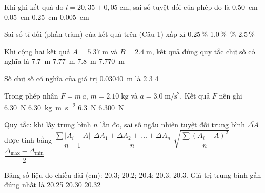 \begin{ex}
	Khi ghi kết quả đo $l = 20{,}35 \pm 0{,}05\;\si{\centi\meter}$, sai số tuyệt đối của phép đo là
	\choice
	{\SI{0.50}{\centi\meter}}
	{\True \SI{0.05}{\centi\meter}}
	{\SI{0.25}{\centi\meter}}
	{\SI{0.005}{\centi\meter}}
	\loigiai{}
\end{ex}

\begin{ex}
	Sai số tỉ đối (phần trăm) của kết quả trên (Câu 1) xấp xỉ
	\choice
	{0.25\,\%}
	{1.0\,\%}
	{\,\%}
	{2.5\,\%}
\end{ex}

\begin{ex}
	Khi cộng hai kết quả $A = 5.37\;\si{\meter}$ và $B = 2.4\;\si{\meter}$, kết quả đúng quy tắc chữ số có nghĩa là
	\choice
	{\SI{7.7}{\meter}}
	{\SI{7.77}{\meter}}
	{\True \SI{7.8}{\meter}}
	{\SI{7.770}{\meter}}
\end{ex}

\begin{ex}
	Số chữ số có nghĩa của giá trị \SI{0.03040}{\meter} là
	\choice
	{2}
	{3}
	{4}
	{}
	\loigiai{}
\end{ex}

\begin{ex}
	Trong phép nhân $F = m\,a$, $m = 2.10\;\si{\kilogram}$ và $a = 3.0\;\si{\meter\per\second^{2}}$. Kết quả $F$ nên ghi
	\choice
	{\SI{6.30}{\newton}}
	{\SI{6.30}{\kilogram\meter\per\second^{2}}}
	{\True \SI{6.3}{\newton}}
	{\SI{6.300}{\newton}}
\end{ex}

\begin{ex}
	Quy tắc: khi lấy trung bình $n$ lần đo, sai số ngẫu nhiên tuyệt đối trung bình $\overline{\Delta A}$ được tính bằng
	\choice
	{$\dfrac{\sum |A_{i}-A|}{n-1}$}
	{\True $\dfrac{\Delta A_{1}+\Delta A_{2}+\,\dots+\Delta A_{n}}{n}$}
	{$\sqrt{\dfrac{\sum (A_{i}-A)^{2}}{n}}$}
	{$\dfrac{\Delta_{\max}-\Delta_{\min}}{2}$}
	\loigiai{}
\end{ex}

\begin{ex}
	Bảng số liệu đo chiều dài (cm): 20.3; 20.2; 20.4; 20.3; 20.3. Giá trị trung bình gần đúng nhất là
	\choice
	{20.25}
	{}
	{20.30}
	{20.32}
	\loigiai{}
\end{ex}

